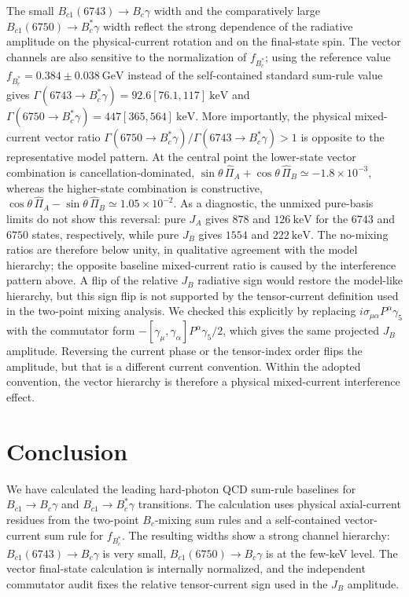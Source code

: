 \documentclass[aps,prd,preprint,nofootinbib,superscriptaddress]{revtex4-2}
\newcommand{\Bc}{B_c}
\newcommand{\Bcst}{B_c^\ast}
\newcommand{\Bcone}{B_{c1}}
\newcommand{\GeV}{\mathrm{GeV}}
\newcommand{\keV}{\mathrm{keV}}
\begin{document}
The small \(\Bcone(6743)\to\Bc\gamma\) width and the comparatively large
\(\Bcone(6750)\to\Bcst\gamma\) width reflect the strong dependence of the
radiative amplitude on the physical-current rotation and on the final-state
spin.  The vector channels are also sensitive to the normalization of
\(f_{\Bcst}\); using the reference value \(f_{\Bcst}=0.384\pm0.038~\GeV\)
instead of the self-contained standard sum-rule value gives
\(\Gamma(6743\to\Bcst\gamma)=92.6[76.1,117]~\keV\) and
\(\Gamma(6750\to\Bcst\gamma)=447[365,564]~\keV\).
More importantly, the physical mixed-current vector ratio
\(\Gamma(6750\to\Bcst\gamma)/\Gamma(6743\to\Bcst\gamma)>1\) is opposite to the
representative model pattern.  At the central point the lower-state vector
combination is cancellation-dominated,
\(\sin\theta\,\widehat\Pi_A+\cos\theta\,\widehat\Pi_B\simeq -1.8\times10^{-3}\),
whereas the higher-state combination is constructive,
\(\cos\theta\,\widehat\Pi_A-\sin\theta\,\widehat\Pi_B\simeq 1.05\times10^{-2}\).
As a diagnostic, the unmixed pure-basis limits do not show this reversal:
pure \(J_A\) gives \(878\) and \(126~\keV\) for the \(6743\) and \(6750\)
states, respectively, while pure \(J_B\) gives \(1554\) and \(222~\keV\).
The no-mixing ratios are therefore below unity, in qualitative agreement with
the model hierarchy; the opposite baseline mixed-current ratio is caused by
the interference pattern above.
A flip of the relative \(J_B\) radiative sign would restore the model-like
hierarchy, but this sign flip is not supported by the tensor-current
definition used in the two-point mixing analysis.  We checked this explicitly
by replacing \(i\sigma_{\mu\alpha}P^\alpha\gamma_5\) with the commutator form
\(-[\gamma_\mu,\gamma_\alpha]P^\alpha\gamma_5/2\), which gives the same
projected \(J_B\) amplitude.  Reversing the current phase or the tensor-index
order flips the amplitude, but that is a different current convention.  Within
the adopted convention, the vector hierarchy is therefore a physical
mixed-current interference effect.

\section{Conclusion}
\label{sec:concl}

We have calculated the leading hard-photon QCD sum-rule baselines for
\(\Bcone\to \Bc\gamma\) and \(\Bcone\to\Bcst\gamma\) transitions.  The
calculation uses physical axial-current residues from the two-point
\(B_c\)-mixing sum rules and a self-contained vector-current sum rule for
\(f_{\Bcst}\).  The resulting widths show a strong channel hierarchy:
\(\Bcone(6743)\to\Bc\gamma\) is very small, \(\Bcone(6750)\to\Bc\gamma\) is at
the few-keV level.  The vector final-state calculation is internally
normalized, and the independent commutator audit fixes the relative
tensor-current sign used in the \(J_B\) amplitude.
\end{document}
